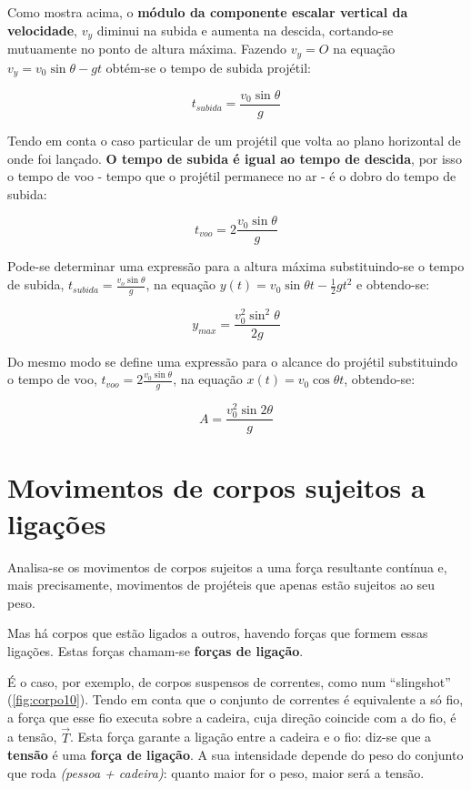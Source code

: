 \documentclass[a4paper,11pt,oneside]{report}
\begin{document}
Como mostra acima, o \textbf{módulo da componente escalar vertical da velocidade}, 
$v_y$ {\scriptsize diminui} na subida e {\Large aumenta} na descida, cortando-se mutuamente no ponto 
de {\Large altura máxima}. Fazendo $v_y = O$ na equação $v_y = v_0 \sin \theta - gt$ 
obtém-se o tempo de subida projétil:

\[
t_{subida} = \frac{v_0 \sin \theta}{g}
\]

Tendo em conta o caso particular de um projétil que volta ao plano horizontal 
de onde foi lançado. \textbf{O tempo de subida é igual ao tempo de descida}, por isso o 
tempo de voo - tempo que o projétil permanece no ar - é o dobro do tempo de subida:

\[
t_{voo} = 2\frac{v_0 \sin \theta}{g}
\]

Pode-se determinar uma expressão para a {\Large altura máxima} substituindo-se o tempo 
de subida, $t_{subida} = \frac{v_o \sin \theta}{g}$, na equação $y(t) = v_0 \sin \theta t - \frac{1}{2} g t^2$ 
e obtendo-se:

\[
y_{max} = \frac{v_{0}^{2} \sin^2 \theta}{2g}
\]

Do mesmo modo se define uma expressão para o alcance do projétil substituindo 
o tempo de voo, $t_{voo} = 2 \frac{v_0 \sin \theta}{g}$, na equação $x(t) = v_0 \cos \theta t$, 
obtendo-se:

\[
A = \frac{v_{0}^{2} \sin 2 \theta}{g}
\]

\chapter{Movimentos de corpos sujeitos a ligações}
\label{chap.ligacoes}

Analisa-se os movimentos de corpos sujeitos a uma força resultante contínua 
e, mais precisamente, movimentos de projéteis que apenas estão sujeitos ao seu 
peso.

Mas há corpos que estão ligados a outros, havendo forças que formem essas 
ligações. Estas forças chamam-se \textbf{forças de ligação}.

É o caso, por exemplo, de corpos suspensos de correntes, como num “slingshot” 
(\autoref{fig:corpo10}). Tendo em conta que o conjunto de correntes é equivalente a só fio, 
a força que esse fio executa sobre a cadeira, cuja direção coincide com a do fio, 
é a tensão, $\vec T$. Esta força garante a ligação entre a cadeira e o fio: diz-se 
que a \textbf{tensão} é uma \textbf{força de ligação}. A sua intensidade depende do 
peso do conjunto que roda \textit{(pessoa + cadeira)}: quanto maior for o peso, maior 
será a tensão.
\end{document}
